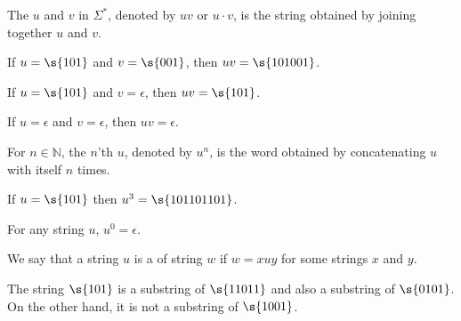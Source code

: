 \begin{definition} \label{definition:Concatenation-of-strings}
The  $u$ and $v$ in $\Sigma^*$, denoted by $uv$ or $u \cdot v$, is the string obtained by joining together $u$ and $v$. 
\end{definition}

\begin{example} \label{example:Concatenation-of-101-and-001}
If $u = \s{101}$ and $v = \s{001}$, then $uv = \s{101001}$.
\end{example}
\begin{example} \label{example:Concatenation-of-101-and-epsilon}
If $u = \s{101}$ and $v = \epsilon$, then $uv = \s{101}$.
\end{example}

\begin{example} \label{example:Concatenation-of-epsilon-and-epsilon}
If $u = \epsilon$ and $v = \epsilon$, then $uv = \epsilon$.
\end{example}

\begin{definition} \label{definition:Powers-of-a-string}
For $n \in \mathbb{N}$, the $n$'th  $u$, denoted by $u^n$, is the word obtained by concatenating $u$ with itself $n$ times.
\end{definition}

\begin{example} \label{example:Third-power-of-101}
If $u = \s{101}$ then $u^3 = \s{101101101}$.
\end{example}

\begin{example} \label{example:Zeroth-power-of-a-string}
For any string $u$, $u^0 = \epsilon$.
\end{example}

\begin{definition}[Substring] \label{definition:Substring}
We say that a string $u$ is a  of string $w$ if $w = xuy$ for some strings $x$ and $y$.
\end{definition}

\begin{example}[$101$ as a substring] \label{example:101-as-a-substring}
The string $\s{101}$ is a substring of $\s{11011}$ and also a substring of $\s{0101}$. 
On the other hand, it is not a substring of $\s{1001}$.
\end{example}

